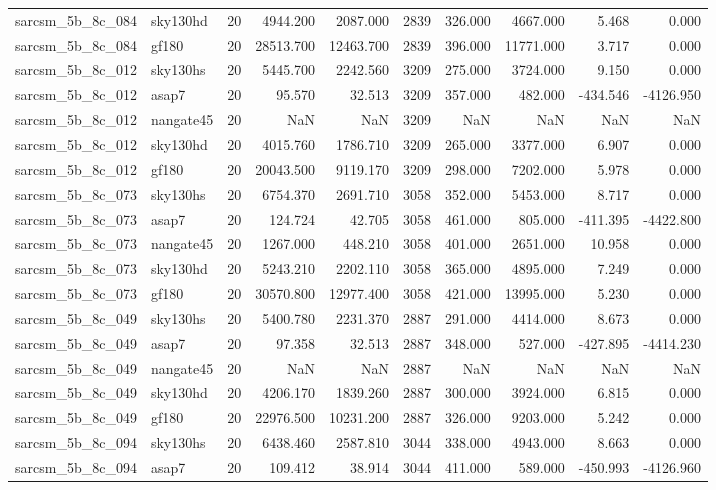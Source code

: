 \documentclass{article}
\begin{document}
\begin{longtable}{llrrrrrrrr}
sarcsm\_5b\_8c\_084 & sky130hd & 20 & 4944.200 & 2087.000 & 2839 & 326.000 & 4667.000 & 5.468 & 0.000 \\
sarcsm\_5b\_8c\_084 & gf180 & 20 & 28513.700 & 12463.700 & 2839 & 396.000 & 11771.000 & 3.717 & 0.000 \\
sarcsm\_5b\_8c\_012 & sky130hs & 20 & 5445.700 & 2242.560 & 3209 & 275.000 & 3724.000 & 9.150 & 0.000 \\
sarcsm\_5b\_8c\_012 & asap7 & 20 & 95.570 & 32.513 & 3209 & 357.000 & 482.000 & -434.546 & -4126.950 \\
sarcsm\_5b\_8c\_012 & nangate45 & 20 & NaN & NaN & 3209 & NaN & NaN & NaN & NaN \\
sarcsm\_5b\_8c\_012 & sky130hd & 20 & 4015.760 & 1786.710 & 3209 & 265.000 & 3377.000 & 6.907 & 0.000 \\
sarcsm\_5b\_8c\_012 & gf180 & 20 & 20043.500 & 9119.170 & 3209 & 298.000 & 7202.000 & 5.978 & 0.000 \\
sarcsm\_5b\_8c\_073 & sky130hs & 20 & 6754.370 & 2691.710 & 3058 & 352.000 & 5453.000 & 8.717 & 0.000 \\
sarcsm\_5b\_8c\_073 & asap7 & 20 & 124.724 & 42.705 & 3058 & 461.000 & 805.000 & -411.395 & -4422.800 \\
sarcsm\_5b\_8c\_073 & nangate45 & 20 & 1267.000 & 448.210 & 3058 & 401.000 & 2651.000 & 10.958 & 0.000 \\
sarcsm\_5b\_8c\_073 & sky130hd & 20 & 5243.210 & 2202.110 & 3058 & 365.000 & 4895.000 & 7.249 & 0.000 \\
sarcsm\_5b\_8c\_073 & gf180 & 20 & 30570.800 & 12977.400 & 3058 & 421.000 & 13995.000 & 5.230 & 0.000 \\
sarcsm\_5b\_8c\_049 & sky130hs & 20 & 5400.780 & 2231.370 & 2887 & 291.000 & 4414.000 & 8.673 & 0.000 \\
sarcsm\_5b\_8c\_049 & asap7 & 20 & 97.358 & 32.513 & 2887 & 348.000 & 527.000 & -427.895 & -4414.230 \\
sarcsm\_5b\_8c\_049 & nangate45 & 20 & NaN & NaN & 2887 & NaN & NaN & NaN & NaN \\
sarcsm\_5b\_8c\_049 & sky130hd & 20 & 4206.170 & 1839.260 & 2887 & 300.000 & 3924.000 & 6.815 & 0.000 \\
sarcsm\_5b\_8c\_049 & gf180 & 20 & 22976.500 & 10231.200 & 2887 & 326.000 & 9203.000 & 5.242 & 0.000 \\
sarcsm\_5b\_8c\_094 & sky130hs & 20 & 6438.460 & 2587.810 & 3044 & 338.000 & 4943.000 & 8.663 & 0.000 \\
sarcsm\_5b\_8c\_094 & asap7 & 20 & 109.412 & 38.914 & 3044 & 411.000 & 589.000 & -450.993 & -4126.960 \\

\end{longtable}
\end{document}
